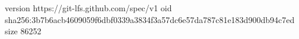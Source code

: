 version https://git-lfs.github.com/spec/v1
oid sha256:3b7b6acb4609059f6dbf0339a3834f3a57dc6e57da787c81e183d900db94c7ed
size 86252
